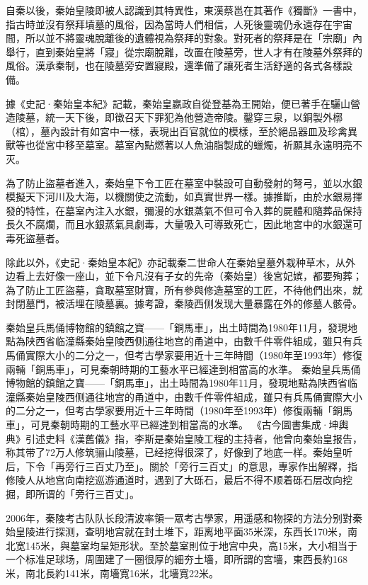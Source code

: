 自秦以後，秦始皇陵即被人認識到其特異性，東漢蔡邕在其著作《獨斷》一書中，指古時並沒有祭拜墳墓的風俗，因為當時人們相信，人死後靈魂仍永遠存在宇宙間，所以並不將靈魂脫離後的遺體視為祭拜的對象。對死者的祭拜是在「宗廟」內舉行，直到秦始皇將「寢」從宗廟脫離，改置在陵墓旁，世人才有在陵墓外祭拜的風俗。漢承秦制，也在陵墓旁安置寢殿，還準備了讓死者生活舒適的各式各樣設備。

據《史記·秦始皇本紀》記載，秦始皇嬴政自從登基為王開始，便已著手在驪山營造陵墓，統一天下後，即徵召天下罪犯為他營造帝陵。鑿穿三泉，以銅製外槨（棺），墓內設計有如宮中一樣，表現出百官就位的模樣，至於絕品器皿及珍禽異獸等也從宮中移至墓室。墓室內點燃著以人魚油脂製成的蠟燭，祈願其永遠明亮不灭。

為了防止盜墓者進入，秦始皇下令工匠在墓室中裝設可自動發射的弩弓，並以水銀模擬天下河川及大海，以機關使之流動，如真實世界一樣。據推斷，由於水銀易揮發的特性，在墓室內注入水銀，彌漫的水銀蒸氣不但可令入葬的屍體和隨葬品保持長久不腐爛，而且水銀蒸氣具劇毒，大量吸入可導致死亡，因此地宮中的水銀還可毒死盜墓者。

除此以外，《史記·秦始皇本紀》亦記載秦二世命人在秦始皇墓外栽种草木，从外边看上去好像一座山，並下令凡沒有子女的先帝（秦始皇）後宮妃嫔，都要殉葬；為了防止工匠盜墓，貪取墓室財寶，所有參與修造墓室的工匠，不待他們出來，就封閉墓門，被活埋在陵墓裏。據考證，秦陵西侧发现大量暴露在外的修墓人骸骨。

秦始皇兵馬俑博物館的鎮館之寶——「銅馬車」，出土時間為1980年11月，發現地點為陕西省临潼縣秦始皇陵西侧通往地宫的甬道中，由數千件零件組成，雖只有兵馬俑實際大小的二分之一，但考古學家要用近十三年時間（1980年至1993年）修復兩輛「銅馬車」，可見秦朝時期的工藝水平已經達到相當高的水準。
秦始皇兵馬俑博物館的鎮館之寶——「銅馬車」，出土時間為1980年11月，發現地點為陕西省临潼縣秦始皇陵西侧通往地宫的甬道中，由數千件零件組成，雖只有兵馬俑實際大小的二分之一，但考古學家要用近十三年時間（1980年至1993年）修復兩輛「銅馬車」，可見秦朝時期的工藝水平已經達到相當高的水準。
《古今圖書集成·坤輿典》引述史料《漢舊儀》指，李斯是秦始皇陵工程的主持者，他曾向秦始皇报告，称其带了72万人修筑骊山陵墓，已经挖得很深了，好像到了地底一样。秦始皇听后，下令「再旁行三百丈乃至」。關於「旁行三百丈」的意思，專家作出解釋，指修陵人从地宫向南挖巡游通道时，遇到了大砾石，最后不得不顺着砾石层改向挖掘，即所谓的「旁行三百丈」。

2006年，秦陵考古队队长段清波率領一眾考古學家，用遥感和物探的方法分别對秦始皇陵进行探测，查明地宫就在封土堆下，距离地平面35米深，东西长170米，南北宽145米，與墓室均呈矩形状。至於墓室則位于地宫中央，高15米，大小相当于一个标准足球场，周圍建了一圈很厚的細夯土墻，即所謂的宮墻，東西長約168米，南北長約141米，南墻寬16米，北墻寬22米。

